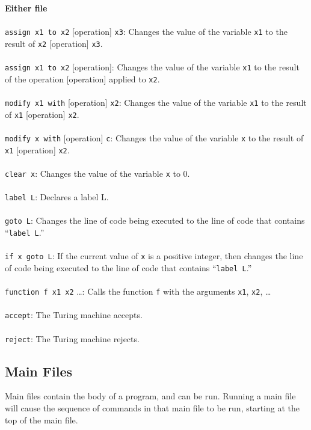 \documentclass{report}
\begin{document}
\textbf{Either file} \\ \\
\texttt{assign x1 to x2} [operation] \texttt{x3}: Changes the value of the variable \texttt{x1} to the result of \texttt{x2} [operation] \texttt{x3}. \\ \\
\texttt{assign x1 to x2} [operation]: Changes the value of the variable \texttt{x1} to the result of the operation [operation] applied to \texttt{x2}. \\ \\
\texttt{modify x1 with} [operation] \texttt{x2}: Changes the value of the variable \texttt{x1} to the result of \texttt{x1} [operation] \texttt{x2}. \\ \\
\texttt{modify x with} [operation] \texttt{c}: Changes the value of the variable \texttt{x} to the result of \texttt{x1} [operation] \texttt{x2}. \\ \\
\texttt{clear x}: Changes the value of the variable \texttt{x} to 0. \\ \\
\texttt{label L}: Declares a label L. \\ \\
\texttt{goto L}: Changes the line of code being executed to the line of code that contains ``\texttt{label L}.'' \\ \\
\texttt{if x goto L}: If the current value of \texttt{x} is a positive integer, then changes the line of code being executed to the line of code that contains ``\texttt{label L}.'' \\ \\
\texttt{function f x1 x2} \dots: Calls the function \texttt{f} with the arguments \texttt{x1}, \texttt{x2}, \dots \\ \\ 
\texttt{accept}: The Turing machine accepts. \\ \\ 
\texttt{reject}: The Turing machine rejects. 

\subsection{Main Files}

Main files contain the body of a program, and can be run. Running a main file will cause the sequence of commands in that main file to be run, starting at the top of the main file. \\
\end{document}
